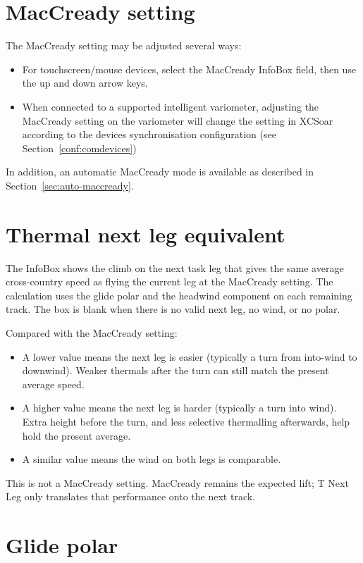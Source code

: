 \section{MacCready setting}

The MacCready setting may be adjusted several ways:
\begin{itemize}
\item For touchscreen/mouse devices, select the MacCready InfoBox field, then
  use the up and down arrow keys.
\item When connected to a supported intelligent variometer, adjusting
  the MacCready setting on the variometer will change the setting
  in XCSoar according to the devices synchronisation configuration (see 
  Section~\ref{conf:comdevices})
\end{itemize}
In addition, an automatic MacCready mode is available as described in
Section~\ref{sec:auto-maccready}.


\section{Thermal next leg equivalent}\label{sec:t-next-leg}

The  InfoBox shows the climb on the next task leg
that gives the same average cross-country speed as flying the current
leg at the MacCready setting.  The calculation uses the glide polar and
the headwind component on each remaining track.  The box is blank when
there is no valid next leg, no wind, or no polar.

Compared with the MacCready setting:
\begin{itemize}
\item A lower value means the next leg is easier (typically a turn from
  into-wind to downwind).  Weaker thermals after the turn can still
  match the present average speed.
\item A higher value means the next leg is harder (typically a turn
  into wind).  Extra height before the turn, and less selective
  thermalling afterwards, help hold the present average.
\item A similar value means the wind on both legs is comparable.
\end{itemize}

This is not a MacCready setting.  MacCready remains the expected lift;
T Next Leg only translates that performance onto the next track.


\section{Glide polar}\label{sec:glidepolar}

